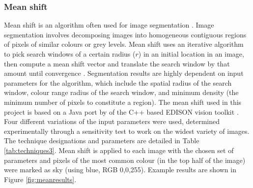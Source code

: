 \documentclass[final,3p,times,authoryear]{elsarticle}
\begin{document}
\subsubsection{Mean shift}\label{sec:mean}

Mean shift is an algorithm often used for image segmentation \citep{Comaniciu1997,Comaniciu2002}. Image segmentation involves decomposing images into homogeneous contiguous regions of pixels of similar colours or grey levels. Mean shift uses an iterative algorithm to pick search windows of a certain radius ($r$) in an initial location in an image, then compute a mean shift vector and translate the search window by that amount until convergence \citep{Comaniciu1997}. Segmentation results are highly dependent on input parameters for the algorithm, which include the spatial radius of the search window, colour range radius of the search window, and minimum density (the minimum number of pixels to constitute a region). The mean shift used in this project is based on a Java port by \cite{Pangburn2002} of the C++ based EDISON vision toolkit \citep{Christoudias2002}. Four different variations of the input parameters were used, determined experimentally through a sensitivity test to work on the widest variety of images. The technique designations and parameters are detailed in Table \ref{tab:techniques3}. Mean shift is applied to each image with the chosen set of parameters and pixels of the most common colour (in the top half of the image) were marked as sky (using blue, RGB 0,0,255). Example results are shown in Figure \ref{fig:meanresults}.
\end{document}
